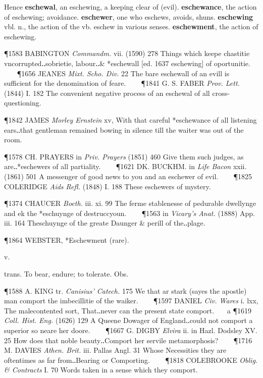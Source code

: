 \begin{description}[wide, labelwidth=!, labelindent=0pt]
\begin{myenumerate}
\noindent Hence \textbf{eschewal}, an eschewing, a keeping clear of (evil). 
\textbf{eschewance}, the action of eschewing; avoidance. 
\textbf{eschewer}, one who eschews, avoids, shuns. 
\textbf{eschewing} vbl. n., the action of the vb. eschew in various senses. 
\textbf{eschewment}, the action of eschewing.

\P 1583 BABINGTON  \textit{Commandm.} vii. (1590) 278 Things which keepe chastitie vncorrupted‥sobrietie, labour‥\& *eschewall [ed. 1637 eschewing]  of oportunitie.    
\P 1656 JEANES  \textit{Mixt. Scho. Div.} 22 The bare eschewall of an evill is sufficient for the denomination of feare.    
\P 1841 G. S. FABER  \textit{Prov. Lett.} (1844) I. 182 The convenient negative process of an eschewal of all cross-questioning.

\P 1842 JAMES  \textit{Morley Ernstein} xv, With that careful *eschewance of all listening ears‥that gentleman remained bowing in silence till the waiter was out of the room.

\P 1578 CH. PRAYERS in  \textit{Priv. Prayers} (1851) 460 Give them such judges, as are‥*eschewers of all partiality.    
\P 1621 DK. BUCKHM. in  \textit{Life Bacon} xxii. (1861) 501 A messenger of good news to you and an eschewer of evil.    
\P 1825 COLERIDGE  \textit{Aids Refl.} (1848) I. 188 These eschewers of mystery.

\P 1374 CHAUCER  \textit{Boeth.} iii. xi. 99 The ferme stablenesse of pedurable dwellynge and ek the *eschuynge of destruccyoun.    
\P 1563 in  \textit{Vicary's Anat.} (1888) App. iii. 164 Theschuynge of the greate Daunger \& perill of the‥plage.

\P 1864 WEBSTER, *Eschewment (rare).
\end{myenumerate}

 v.

\noindent {}

\vspace{-0.3cm}

\begin{myenumerate}

 trans. To bear, endure; to tolerate. Obs.

\P 1588 A. KING tr. \textit{Canisius' Catech.} 175 We that ar stark (sayes the apostle) man comport the imbecillitie of the waiker.    
\P 1597 DANIEL  \textit{Civ. Wares} i. lxx, The malecontented sort, That‥never can the present state comport.    a 
\P 1619 \textit{Coll. Hist. Eng.} (1626) 129 A Queene Dowager of England‥could not comport a superior so neare her doore.    
\P 1667 G. DIGBY  \textit{Elvira} ii. in Hazl. Dodsley XV. 25 How does that noble beauty‥Comport her servile metamorphosis?    
\P 1716 M. DAVIES  \textit{Athen. Brit.} iii. Pallas Angl. 31 Whose Necessities they are oftentimes as far from‥Bearing or Comporting.    
\P 1818 COLEBROOKE  \textit{Oblig. \& Contracts} I. 70 Words taken in a sense which they comport.


\end{myenumerate}
\end{description}
